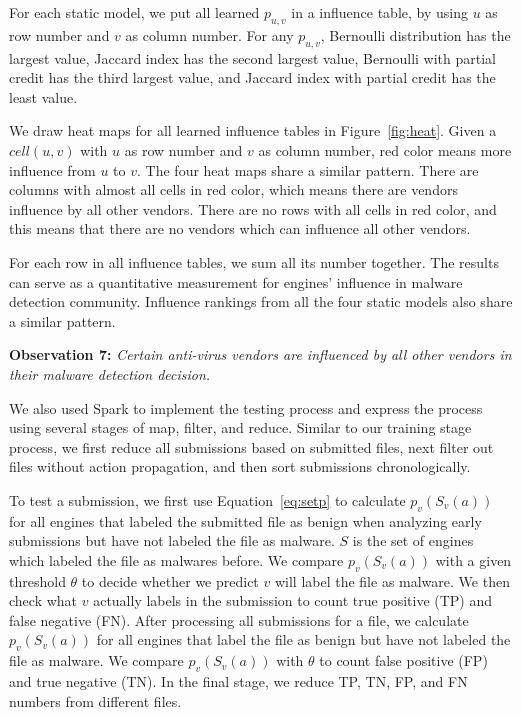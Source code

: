 For each static model, 
we put all learned $p_{u,v}$ in a influence table, 
by using $u$ as row number and $v$ as column number.
For any $p_{u,v}$, Bernoulli distribution has the largest value, 
Jaccard index has the second largest value, 
Bernoulli with partial credit has the third largest value,
and Jaccard index with partial credit has the least value. 



We draw heat maps for all learned influence tables in Figure~\ref{fig:heat}. 
Given a $cell(u, v)$ with $u$ as row number and $v$ as column number, 
red color means more influence from $u$ to $v$. 
The four heat maps share a similar pattern.
There are columns with almost all cells in red color, 
which means there are vendors influence by all other vendors. 
There are no rows with all cells in red color, 
and this means that there are no vendors which can influence all other vendors. 

For each row in all influence tables, we sum all its number together. 
The results can serve as a quantitative measurement for engines' influence in malware detection community. 
Influence rankings from all the four static models also share a similar pattern. 

{\bf Observation 7:} 
{\em Certain anti-virus vendors are influenced by all other vendors in their malware detection decision.}

We also used Spark to implement the testing process and express the process using several stages of map, filter, and reduce.
Similar to our training stage process, 
we first reduce all submissions based on submitted files,
next filter out files without action propagation, 
and then sort submissions chronologically. 

To test a submission, we first use Equation~\ref{eq:setp} to
calculate $p_v(S_v(a))$ for all engines
that labeled the submitted file as benign when analyzing early submissions 
but have not labeled the file as malware. 
$S$ is the set of engines which labeled the file as malwares before.
We compare $p_v(S_v(a))$ with a given threshold $\theta$ to decide whether we predict 
$v$ will label the file as malware.
We then check what $v$ actually labels in the submission to count true positive (TP) and false negative (FN). 
After processing all submissions for a file, 
we calculate $p_v(S_v(a))$ for all engines  
that label the file as benign but have not labeled the file as malware.
We compare $p_v(S_v(a))$ with $\theta$ to count false positive (FP) and true negative (TN).
In the final stage, we reduce TP, TN, FP, and FN numbers from different files.

